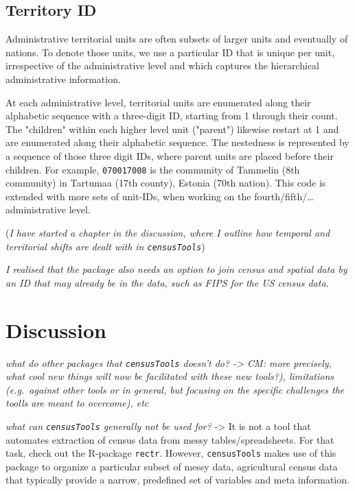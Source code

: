 \documentclass[12pt,]{article}
\begin{document}
\hypertarget{territory-id}{%
\subsection{Territory ID}\label{territory-id}}

Administrative territorial units are often subsets of larger units and eventually of nations.
To denote those units, we use a particular ID that is unique per unit, irrespective of the administrative level and which captures the hierarchical administrative information.

At each administrative level, territorial units are enumerated along their alphabetic sequence with a three-digit ID, starting from 1 through their count. The "children" within each higher level unit ("parent") likewise restart at 1 and are enumerated along their alphabetic sequence.
The nestedness is represented by a sequence of those three digit IDs, where parent units are placed before their children. For example, \texttt{070\textquotesingle{}017\textquotesingle{}008} is the community of Tammelin (8th community) in Tartumaa (17th county), Estonia (70th nation).
This code is extended with more sets of unit-IDs, when working on the fourth/fifth/\ldots{} administrative level.

(\emph{I have started a chapter in the discussion, where I outline how temporal and territorial shifts are dealt with in \texttt{censusTools}})

\emph{I realised that the package also needs an option to join census and spatial data by an ID that may already be in the data, such as FIPS for the US census data.}

\hypertarget{discussion}{%
\section{Discussion}\label{discussion}}

\emph{what do other packages that \texttt{censusTools} doesn't do? -\textgreater{} CM: more precisely, what cool new things will now be facilitated with these new tools?), limitations (e.g.~against other tools or in general, but focusing on the specific challenges the toolls are meant to overcome), etc}

\emph{what can \texttt{censusTools} generally not be used for?} -\textgreater{} It is not a tool that automates extraction of census data from messy tables/spreadsheets.
For that task, check out the R-package \texttt{rectr}.
However, \texttt{censusTools} makes use of this package to organize a particular subset of messy data, agricultural census data that typically provide a narrow, predefined set of variables and meta information.
\end{document}

